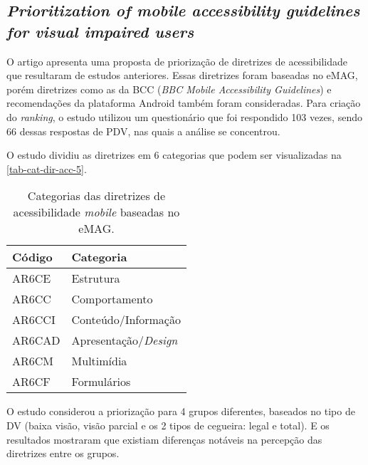 \subsection{\emph{Prioritization of mobile accessibility guidelines for visual impaired users}}

O artigo apresenta uma proposta de priorização de diretrizes de acessibilidade que resultaram de estudos anteriores.
Essas diretrizes foram baseadas no eMAG, porém diretrizes como as da BCC (\emph{BBC Mobile Accessibility Guidelines}) e recomendações da plataforma Android também foram consideradas.
Para criação do \emph{ranking}, o estudo utilizou um questionário que foi respondido 103 vezes, sendo 66 dessas respostas de PDV, nas quais a análise se concentrou.

O estudo dividiu as diretrizes em 6 categorias que podem ser visualizadas na \autoref{tab-cat-dir-acc-5}.

\begin{table}[htb]
  \begin{center}
    \ABNTEXfontereduzida
    \caption{Categorias das diretrizes de acessibilidade \emph{mobile} baseadas no eMAG.}
    \label{tab-cat-dir-acc-5}
    \begin{tabular}{p{1.5cm}|p{4.5cm}}
      \textbf{Código} & \textbf{Categoria}         \\
      \hline
      AR6CE           & Estrutura                  \\
      \hline
      AR6CC           & Comportamento              \\
      \hline
      AR6CCI          & Conteúdo/Informação        \\
      \hline
      AR6CAD          & Apresentação/\emph{Design} \\
      \hline
      AR6CM           & Multimídia                 \\
      \hline
      AR6CF           & Formulários                \\
    \end{tabular}
  \end{center}
\end{table}

O estudo considerou a priorização para 4 grupos diferentes, baseados no tipo de DV (baixa visão, visão parcial e os 2 tipos de cegueira: legal e total).
E os resultados mostraram que existiam diferenças notáveis na percepção das diretrizes entre os grupos.

